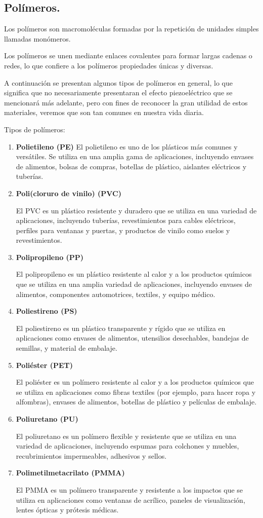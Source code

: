 \documentclass[12pt]{article}
\begin{document}
\subsection{Polímeros.}

Los polímeros son macromoléculas formadas por la repetición de unidades simples llamadas monómeros.

Los polímeros se unen mediante enlaces covalentes para formar largas cadenas o redes, lo que confiere a los polímeros propiedades únicas y diversas.

A continuación se presentan algunos tipos de polímeros en general, lo que significa que no necesariamente presentaran el efecto piezoeléctrico que se mencionará más adelante, pero con fines de reconocer la gran utilidad de estos materiales, veremos que son tan comunes en nuestra vida diaria.

Tipos de polímeros:
\begin{enumerate}
\item \textbf{Polietileno (PE)}
El polietileno es uno de los plásticos más comunes y versátiles. Se utiliza en una amplia gama de aplicaciones, incluyendo envases de alimentos, bolsas de compras, botellas de plástico, aislantes eléctricos y tuberías.
\item \textbf{Poli(cloruro de vinilo) (PVC)}

El PVC es un plástico resistente y duradero que se utiliza en una variedad de aplicaciones, incluyendo tuberías, revestimientos para cables eléctricos, perfiles para ventanas y puertas, y productos de vinilo como suelos y revestimientos.
\item \textbf{Polipropileno (PP)}

El polipropileno es un plástico resistente al calor y a los productos químicos que se utiliza en una amplia variedad de aplicaciones, incluyendo envases de alimentos, componentes automotrices, textiles, y equipo médico.
\item \textbf{Poliestireno (PS)}

El poliestireno es un plástico transparente y rígido que se utiliza en aplicaciones como envases de alimentos, utensilios desechables, bandejas de semillas, y material de embalaje.
\item \textbf{Poliéster (PET)}

El poliéster es un polímero resistente al calor y a los productos químicos que se utiliza en aplicaciones como fibras textiles (por ejemplo, para hacer ropa y alfombras), envases de alimentos, botellas de plástico y películas de embalaje.
\item \textbf{Poliuretano (PU)}

El poliuretano es un polímero flexible y resistente que se utiliza en una variedad de aplicaciones, incluyendo espumas para colchones y muebles, recubrimientos impermeables, adhesivos y sellos.
\item \textbf{Polimetilmetacrilato (PMMA)}

El PMMA es un polímero transparente y resistente a los impactos que se utiliza en aplicaciones como ventanas de acrílico, paneles de visualización, lentes ópticas y prótesis médicas.
\end{enumerate}
\end{document}
